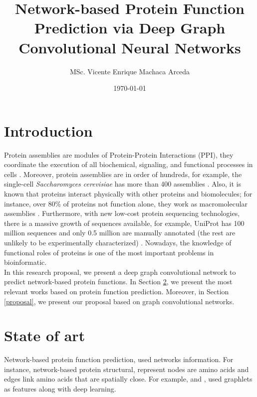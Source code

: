 \documentclass[a4paper]{article}
\title{Network-based Protein Function Prediction via Deep Graph Convolutional Neural Networks}
\author{MSc. Vicente Enrique Machaca Arceda}
\date{\today}
\begin{document}
\maketitle

\section{Introduction}

Protein assemblies are modules of Protein-Protein Interactions (PPI), they coordinate the execution of all biochemical, signaling, and functional processes in cells \citep{alberts1998cell}. Moreover, protein assemblies are in order of hundreds, for example, the single-cell \textit{Saccharomyces cerevisiae} has more than 400 assemblies \citep{srihari2017computational}. Also, it is known that proteins interact physically with other proteins and biomolecules; for instance, over 80\% of proteins not function alone, they work as macromolecular assemblies \citep{berggaard2007methods}. Furthermore, with new low-cost protein sequencing technologies, there is a massive growth of sequences available, for example, UniProt has 100 million sequences and only 0.5 million are manually annotated (the rest are unlikely to be experimentally characterized) \citep{gligorijevic2020structure}. Nowadays, the knowledge of functional roles of proteins is one of the most important problems in bioinformatic.\\

In this research proposal, we present a deep graph convolutional network to predict network-based protein functions. In Section \ref{stateart}, we present the most relevant works based on protein function prediction. Moreover, in Section \ref{proposal}, we present our proposal based on graph convolutional networks. 

\section{State of art}\label{stateart}

Network-based protein function prediction, used networks information. For instance, network-based protein structural, represent nodes are amino acids and edges link amino acids that are spatially close. For example, \cite{newaz2018network} and \cite{ghalehnovi2019novel}, used graphlets as features along with deep learning. \\
\end{document}

